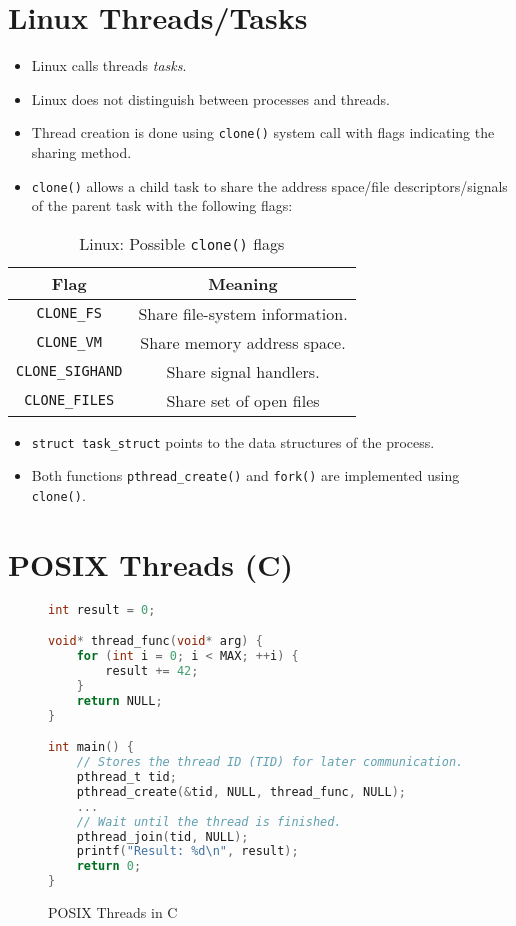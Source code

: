     \section{Linux Threads/Tasks}
        \begin{itemize}
        	\item Linux calls threads \textit{tasks}.
        	\item Linux does not distinguish between processes and threads.
        	\item Thread creation is done using \texttt{clone()} system call with flags indicating the sharing method.
        	\item \texttt{clone()} allows a child task to share the address space/file descriptors/signals of the parent task with the following flags:
        \end{itemize}
        \begin{table}[H]
        	\centering
        	\begin{tabular}{c | c}
        		         Flag           & Meaning                        \\ \hline
        		  \texttt{CLONE\_FS}    & Share file-system information. \\
        		  \texttt{CLONE\_VM}    & Share memory address space.    \\
        		\texttt{CLONE\_SIGHAND} & Share signal handlers.         \\
        		 \texttt{CLONE\_FILES}  & Share set of open files
        	\end{tabular}
        	\caption{Linux: Possible \texttt{clone()} flags}
        \end{table}
        \begin{itemize}
        	\item \texttt{struct task\_struct} points to the data structures of the process.
        	\item Both functions \texttt{pthread\_create()} and \texttt{fork()} are implemented using \texttt{clone()}.
        \end{itemize}

    \section{POSIX Threads (C)}
        \begin{figure}[H]
        	\centering
        	\begin{lstlisting}[language = C]
int result = 0;

void* thread_func(void* arg) {
	for (int i = 0; i < MAX; ++i) {
		result += 42;
	}
	return NULL;
}

int main() {
	// Stores the thread ID (TID) for later communication.
	pthread_t tid;
	pthread_create(&tid, NULL, thread_func, NULL);
	...
	// Wait until the thread is finished.
	pthread_join(tid, NULL);
	printf("Result: %d\n", result);
	return 0;
}
\end{lstlisting}
        	\caption{POSIX Threads in C}
        \end{figure}

